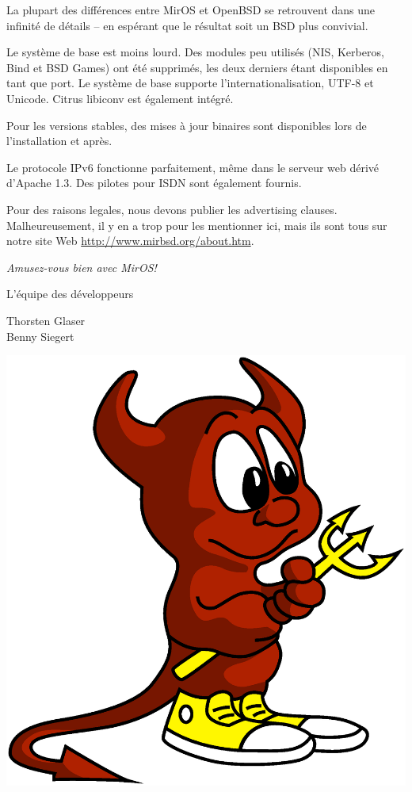 \documentclass[a4paper,landscape,11pt,notumble]{leaflet}
\begin{document}
La plupart des différences entre MirOS et OpenBSD se retrouvent dans une infinité de détails – en espérant que le résultat soit un BSD plus convivial.

Le système de base est moins lourd. Des modules peu utilisés (NIS, Kerberos, Bind et BSD Games) ont été supprimés, les deux derniers étant disponibles en tant que port. Le système de base supporte l’internationalisation, UTF-8 et Unicode. Citrus libiconv est également intégré.

Pour les versions stables, des mises à jour binaires sont disponibles lors de l’installation et après.

Le protocole IPv6 fonctionne parfaitement, même dans le serveur web dérivé d’Apache 1.3. Des pilotes pour ISDN sont également fournis.

Pour des raisons legales, nous devons publier les advertising clauses. Malheureusement, il y en a trop pour les mentionner ici, mais ils sont tous sur notre site Web
\url{http://www.mirbsd.org/about.htm}.

\newpage


\graybox\par
\begin{center}
\vspace{3ex}
{\Large\itshape
Amusez-vous bien avec MirOS!\par\medskip
L'équipe des développeurs\par\medskip
\color{darkred}%
Thorsten Glaser\\
Benny Siegert\par
}

\vfill

\includegraphics[width=0.75\columnwidth]{img/bsdaemon}

\vfill%
\end{center}%
\end{document}
